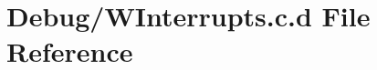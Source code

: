\hypertarget{_debug_2_w_interrupts_8c_8d}{\section{\-Debug/\-W\-Interrupts.c.\-d \-File \-Reference}
\label{_debug_2_w_interrupts_8c_8d}
}
